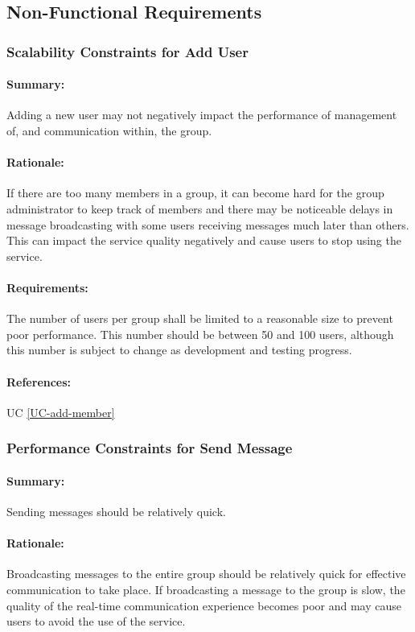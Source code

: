 \documentclass[11pt]{article}
\begin{document}
\subsection{Non-Functional Requirements}

\subsubsection{Scalability Constraints for Add User} \label{NFR-scalability-add-member}
\paragraph{Summary:} Adding a new user may not negatively impact the performance of management of, and communication within, the group.
\paragraph{Rationale:} If there are too many members in a group, it can become hard for the group administrator to keep track of members and there may be noticeable delays in message broadcasting with some users receiving messages much later than others. This can impact the service quality negatively and cause users to stop using the service.
\paragraph{Requirements:} The number of users per group shall be limited to a reasonable size to prevent poor performance. This number should be between 50 and 100 users, although this number is subject to change as development and testing progress.
\paragraph{References:} UC \ref{UC-add-member}

\subsubsection{Performance Constraints for Send Message} \label{NFR-performance-send-message}
\paragraph{Summary:} Sending messages should be relatively quick.
\paragraph{Rationale:} Broadcasting messages to the entire group should be relatively quick for effective communication to take place. If broadcasting a message to the group is slow, the quality of the real-time communication experience becomes poor and may cause users to avoid the use of the service. 
\end{document}
